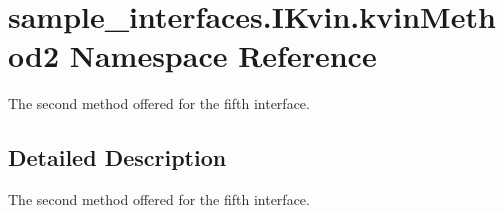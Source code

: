 \hypertarget{namespacesample__interfaces_1_1_i_kvin_1_1kvin_method2}{\section{sample\-\_\-interfaces.\-I\-Kvin.\-kvin\-Method2 Namespace Reference}
\label{namespacesample__interfaces_1_1_i_kvin_1_1kvin_method2}
}


The second method offered for the fifth interface.  




\subsection{Detailed Description}
The second method offered for the fifth interface. 